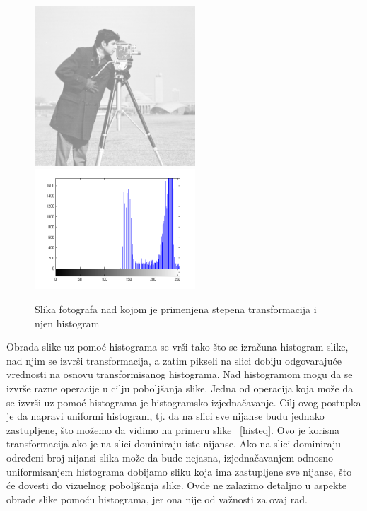 \documentclass[a4paper,12pt,titlepage]{article}
\begin{document}
\begin{figure}[ht!]
\centering
\includegraphics[width=60mm]{img/imgPow2.png}
\includegraphics[width=60mm]{img/histImgPow2.png}
\caption{Slika fotografa nad kojom je primenjena stepena transformacija i njen histogram}
\label{hist3}
\end{figure}

Obrada slike uz pomoć histograma se vrši tako što se izračuna histogram slike, nad njim se izvrši transformacija, a zatim pikseli na slici dobiju odgovarajuće vrednosti na osnovu transformisanog histograma. Nad histogramom mogu da se izvrše razne operacije u cilju poboljšanja slike. 
Jedna od operacija koja može da se izvrši uz pomoć histograma je histogramsko izjednačavanje. Cilj ovog postupka je da napravi uniformi histogram, tj. da na slici sve nijanse budu jednako zastupljene, što možemo da vidimo na primeru slike ~\ref{histeq}. Ovo je korisna transformacija ako je na slici dominiraju iste nijanse. Ako na slici dominiraju određeni broj nijansi slika može da bude nejasna, izjednačavanjem odnosno uniformisanjem histograma dobijamo sliku koja ima zastupljene sve nijanse, što će dovesti do vizuelnog poboljšanja slike. Ovde ne zalazimo detaljno u aspekte obrade slike pomoću histograma, jer ona nije od važnosti za ovaj rad.
\end{document}
